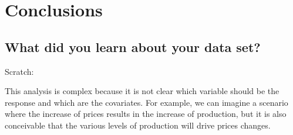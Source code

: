\section{Conclusions}

\subsection{What did you learn about your data set?}


Scratch:

This analysis is complex because it is not clear which variable should be the response and which are the covariates.
For example, we can imagine a scenario where the increase of prices results in the increase of production, but it is also conceivable that the various levels of
production will drive prices changes.

